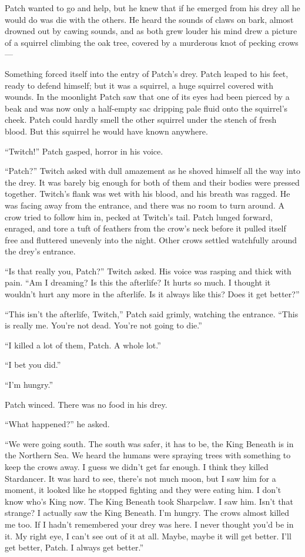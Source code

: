 \documentclass[ebook,oneside,openany,17pt]{memoir}
\begin{document}
Patch wanted to go and help, but he knew that if he emerged from his
drey all he would do was die with the others. He heard the sounds of
claws on bark, almost drowned out by cawing sounds, and as both grew
louder his mind drew a picture of a squirrel climbing the oak tree,
covered by a murderous knot of pecking crows —

Something forced itself into the entry of Patch’s drey. Patch leaped
to his feet, ready to defend himself; but it was a squirrel, a huge
squirrel covered with wounds. In the moonlight Patch saw that one of
its eyes had been pierced by a beak and was now only a half-empty sac
dripping pale fluid onto the squirrel’s cheek. Patch could hardly
smell the other squirrel under the stench of fresh blood. But this
squirrel he would have known anywhere.

“Twitch!” Patch gasped, horror in his voice.

“Patch?” Twitch asked with dull amazement as he shoved himself all the
way into the drey. It was barely big enough for both of them and their
bodies were pressed together. Twitch’s flank was wet with his blood,
and his breath was ragged. He was facing away from the entrance, and
there was no room to turn around. A crow tried to follow him in,
pecked at Twitch’s tail. Patch lunged forward, enraged, and tore a
tuft of feathers from the crow’s neck before it pulled itself free and
fluttered unevenly into the night. Other crows settled watchfully
around the drey’s entrance.

“Is that really you, Patch?” Twitch asked. His voice was rasping and
thick with pain. “Am I dreaming? Is this the afterlife? It hurts so
much. I thought it wouldn’t hurt any more in the afterlife. Is it
always like this? Does it get better?”

“This isn’t the afterlife, Twitch,” Patch said grimly, watching the
entrance. “This is really me. You’re not dead. You’re not going to
die.”

“I killed a lot of them, Patch. A whole lot.”

“I bet you did.”

“I’m hungry.”

Patch winced. There was no food in his drey.

“What happened?” he asked.

“We were going south. The south was safer, it has to be, the King
Beneath is in the Northern Sea. We heard the humans were spraying
trees with something to keep the crows away. I guess we didn’t get far
enough. I think they killed Stardancer. It was hard to see, there’s
not much moon, but I saw him for a moment, it looked like he stopped
fighting and they were eating him. I don’t know who’s King now. The
King Beneath took Sharpclaw. I saw him. Isn’t that strange? I actually
saw the King Beneath. I’m hungry. The crows almost killed me too. If I
hadn’t remembered your drey was here. I never thought you’d be in
it. My right eye, I can’t see out of it at all. Maybe, maybe it will
get better. I’ll get better, Patch. I always get better.”
\end{document}
